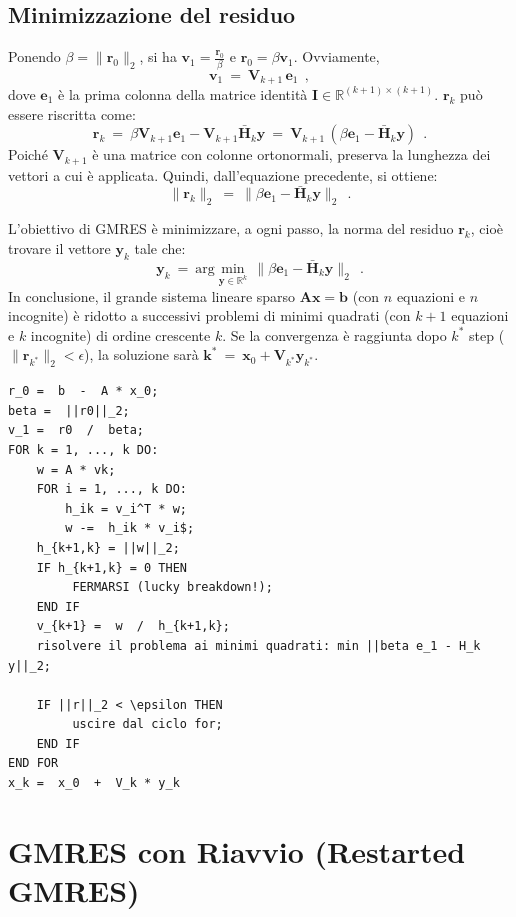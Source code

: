 \subsection{Minimizzazione del residuo}
Ponendo $\beta = \|\mathbf{r}_0\|_2$, si ha $\mathbf{v}_1 = \frac{\mathbf{r}_0}{\beta}$ e $\mathbf{r}_0 = \beta \mathbf{v}_1$. Ovviamente,
\[
\mathbf{v}_1\ =\ \mathbf{V}_{k+1}\, \mathbf{e}_1\ \ , 
\]
dove $\mathbf{e}_1$ è la prima colonna della matrice identità $\mathbf{I} \in \mathbb{R}^{(k+1) \times (k+1)}$. $\mathbf r_k$ può essere riscritta come:
\[
\mathbf{r}_k\ =\ \beta \mathbf{V}_{k+1} \mathbf{e}_1 - \mathbf{V}_{k+1} \bar{\mathbf{H}}_k \mathbf{y}\ =\ \mathbf{V}_{k+1}\, (\beta \mathbf{e}_1 - \bar{\mathbf{H}}_k \mathbf{y})\ \ .
\]
Poiché $\mathbf{V}_{k+1}$ è una matrice con colonne ortonormali, preserva la lunghezza dei vettori a cui è applicata. Quindi, dall'equazione precedente, si ottiene:
\[
\|\mathbf{r}_k\|_2\ =\ \|\beta \mathbf{e}_1 - \bar{\mathbf{H}}_k \mathbf{y}\|_2\ \ . 
\]

L'obiettivo di GMRES è minimizzare, a ogni passo, la norma del residuo $\mathbf{r}_k$, cioè trovare il vettore $\mathbf{y}_k$ tale che:
\[
\mathbf{y}_k\ =\ \text{arg}\min_{\mathbf{y} \in \mathbb{R}^k}\, \|\beta \mathbf{e}_1 - \bar{\mathbf{H}}_k \mathbf{y}\|_2\ \ . 
\]
In conclusione, il grande sistema lineare sparso $\mathbf{A}\mathbf{x} = \mathbf{b}$ (con $n$ equazioni e $n$ incognite) è ridotto a successivi problemi di minimi quadrati (con $k+1$ equazioni e $k$ incognite) di ordine crescente $k$.
Se la convergenza è raggiunta dopo $k^*$ step ($\|\mathbf{r}_{k^*}\|_2 <\epsilon $), la soluzione sarà $\mathbf{k^*}\ =\ \mathbf{x}_0 + \mathbf{V}_{k^*} \mathbf{y}_{k^*}$.
%
%
%
\begin{lstlisting}[caption={Algoritmo GMRES}]
r_0 =  b  -  A * x_0;
beta =  ||r0||_2; 
v_1 =  r0  /  beta;
FOR k = 1, ..., k DO:
	w = A * vk;
	FOR i = 1, ..., k DO:
		h_ik = v_i^T * w;
		w -=  h_ik * v_i$;
	h_{k+1,k} = ||w||_2;
	IF h_{k+1,k} = 0 THEN
		 FERMARSI (lucky breakdown!);
	END IF	
	v_{k+1} =  w  /  h_{k+1,k};
	risolvere il problema ai minimi quadrati: min ||beta e_1 - H_k y||_2;
	
	IF ||r||_2 < \epsilon THEN
		 uscire dal ciclo for;
	END IF
END FOR
x_k =  x_0  +  V_k * y_k
\end{lstlisting}
%
%
%
\section{GMRES con Riavvio (Restarted GMRES)}

